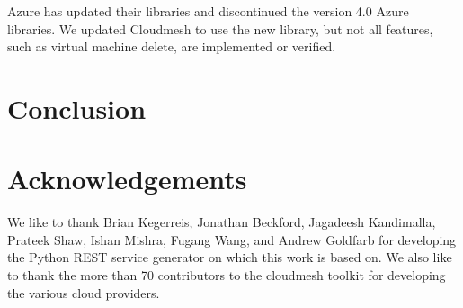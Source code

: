 Azure has updated their libraries and discontinued the version 4.0 Azure
libraries. We updated Cloudmesh to use the new library, but not all
features, such as virtual machine delete, are implemented or verified.

\section{Conclusion}
\label{sec:conclusion}



\section*{Acknowledgements}\label{acknowledgements}

We like to thank
Brian Kegerreis,
Jonathan Beckford,
Jagadeesh Kandimalla,
Prateek Shaw,
Ishan Mishra,
Fugang Wang, and Andrew Goldfarb for developing the Python REST service generator on which this work is based on. We also like to thank the more than 70 contributors to the cloudmesh toolkit for developing the various cloud providers. 






\clearpage

